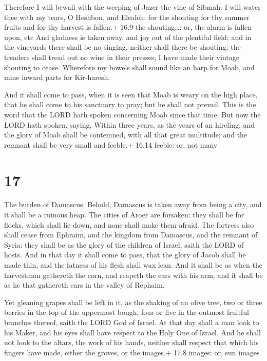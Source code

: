  Therefore I will bewail with the weeping of Jazer the
vine of Sibmah: I will water thee with my tears, O Heshbon, and Elealeh:
for the shouting for thy summer fruits and for thy harvest is fallen.+
16.9 the shouting\ldots: or, the alarm is fallen upon, etc 
And gladness is taken away, and joy out of the plentiful field; and in
the vineyards there shall be no singing, neither shall there be
shouting: the treaders shall tread out no wine in their presses; I have
made their vintage shouting to cease.  Wherefore my bowels
shall sound like an harp for Moab, and mine inward parts for Kir-haresh.

 And it shall come to pass, when it is seen that Moab is
weary on the high place, that he shall come to his sanctuary to pray;
but he shall not prevail.  This is the word that the LORD
hath spoken concerning Moab since that time.  But now the
LORD hath spoken, saying, Within three years, as the years of an
hireling, and the glory of Moab shall be contemned, with all that great
multitude; and the remnant shall be very small and feeble.+ 16.14
feeble: or, not many

\hypertarget{section-16}{%
\section{17}\label{section-16}}

 The burden of Damascus. Behold, Damascus is taken away from
being a city, and it shall be a ruinous heap.  The cities of
Aroer are forsaken: they shall be for flocks, which shall lie down, and
none shall make them afraid.  The fortress also shall cease
from Ephraim, and the kingdom from Damascus, and the remnant of Syria:
they shall be as the glory of the children of Israel, saith the LORD of
hosts.  And in that day it shall come to pass, that the
glory of Jacob shall be made thin, and the fatness of his flesh shall
wax lean.  And it shall be as when the harvestman gathereth
the corn, and reapeth the ears with his arm; and it shall be as he that
gathereth ears in the valley of Rephaim.

 Yet gleaning grapes shall be left in it, as the shaking
of an olive tree, two or three berries in the top of the uppermost
bough, four or five in the outmost fruitful branches thereof, saith the
LORD God of Israel.  At that day shall a man look to his
Maker, and his eyes shall have respect to the Holy One of Israel.
 And he shall not look to the altars, the work of his hands,
neither shall respect that which his fingers have made, either the
groves, or the images.+ 17.8 images: or, sun images

